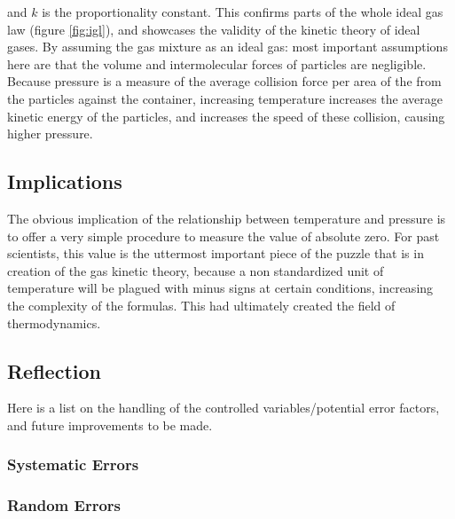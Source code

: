 \documentclass[a4paper,12pt]{article}
\begin{document}
and $k$ is the proportionality constant. This confirms parts of the whole ideal gas law (figure \ref{fig:igl}), and showcases the validity of the kinetic theory of ideal gases. By assuming the gas mixture as an ideal gas: most important assumptions here are that the volume and intermolecular forces of particles are negligible. Because pressure is a measure of the average collision force per area of the from the particles against the container, increasing temperature increases the average kinetic energy of the particles, and increases the speed of these collision, causing higher pressure.

\subsection{Implications}
The obvious implication of the relationship between temperature and pressure is to offer a very simple procedure to measure the value of absolute zero. For past scientists, this value is the uttermost important piece of the puzzle that is in creation of the gas kinetic theory, because a non standardized unit of temperature will be plagued with minus signs at certain conditions, increasing the complexity of the formulas. This had ultimately created the field of thermodynamics.



\subsection{Reflection}



Here is a list on the handling of the controlled variables/potential error factors, and future improvements to be made.

\subsubsection*{Systematic Errors}
\subsubsection*{Random Errors}

\newpage
\end{document}

